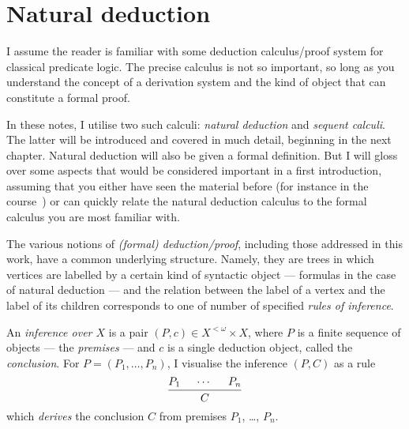 \chapter{Natural deduction}

I assume the reader is familiar with some deduction calculus/proof system for classical predicate logic.
The precise calculus is not so important, so long as you understand the concept of a derivation system and the kind of object that can constitute a formal proof.

In these notes, I utilise two such calculi: \emph{natural deduction} and \emph{sequent calculi}.
The latter will be introduced and covered in much detail, beginning in the next chapter.
Natural deduction will also be given a formal definition.
But I will gloss over some aspects that would be considered important in a first introduction, assuming that you either have seen the material before (for instance in the course~) or can quickly relate the natural deduction calculus to the formal calculus you are most familiar with.

The various notions of \emph{(formal) deduction/proof}, including those addressed in this work, have a common underlying structure.
Namely, they are trees in which vertices are labelled by a certain kind of syntactic object --- formulas in the case of natural deduction --- and the relation between the label of a vertex and the label of its children corresponds to one of number of specified \emph{rules of inference}.

An \emph{inference over \( X \)} is a pair \( ( P , c ) ∈ X^{<ω} × X \), where \( P \) is a finite sequence of objects --- the \emph{premises} --- and \( c \) is a single deduction object, called the \emph{conclusion}.
For \( P = ( P_1 , …, P_n ) \), I visualise the inference \( ( P , C ) \) as a rule
\[
\begin{prooftree}
	\hypo{ P_1 }
	\hypod \hypo{ P_n }
	\infer3{C}
\end{prooftree}
\]
which \emph{derives} the conclusion \( C \) from premises \( P_1 \), …, \( P_n \).

